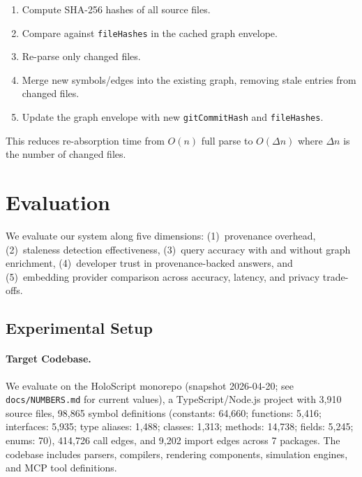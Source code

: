 \documentclass[conference]{IEEEtran}
\begin{document}
\begin{enumerate}
  \item Compute SHA-256 hashes of all source files.
  \item Compare against \texttt{fileHashes} in the cached graph envelope.
  \item Re-parse only changed files.
  \item Merge new symbols/edges into the existing graph, removing stale
    entries from changed files.
  \item Update the graph envelope with new \texttt{gitCommitHash} and
    \texttt{fileHashes}.
\end{enumerate}

This reduces re-absorption time from $O(n)$ full parse to $O(\Delta n)$
where $\Delta n$ is the number of changed files.


\section{Evaluation}
\label{sec:evaluation}

We evaluate our system along five dimensions: (1)~provenance overhead,
(2)~staleness detection effectiveness, (3)~query accuracy with and
without graph enrichment, (4)~developer trust in
provenance-backed answers, and (5)~embedding provider comparison
across accuracy, latency, and privacy trade-offs.

\subsection{Experimental Setup}
\label{sec:eval:setup}

\paragraph{Target Codebase.} We evaluate on the HoloScript monorepo
(snapshot 2026-04-20; see \texttt{docs/NUMBERS.md} for current values), a
TypeScript/Node.js project with 3,910 source files, 98,865 symbol
definitions (constants: 64,660; functions: 5,416; interfaces: 5,935;
type aliases: 1,488; classes: 1,313; methods: 14,738; fields: 5,245;
enums: 70), 414,726 call edges, and 9,202 import edges across 7
packages. The codebase includes parsers, compilers, rendering
components, simulation engines, and MCP tool definitions.
\end{document}
